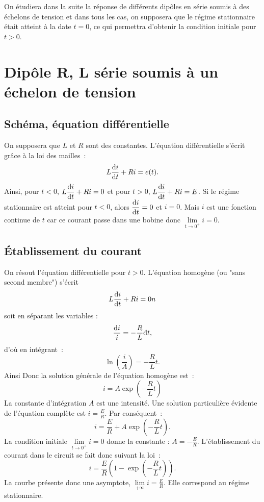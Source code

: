 On étudiera dans la suite la réponse de différents dipôles en série soumis à 
des échelons de tension et dans tous les cas, on supposera que le régime 
stationnaire était atteint à la date \(t = 0\), ce qui permettra d’obtenir la 
condition initiale pour \(t > 0\).
\section{Dipôle R, L série soumis à un échelon de tension}%
\subsection{Schéma, équation différentielle}%
On supposera que \(L\) et \(R\) sont des constantes. L’équation différentielle 
s’écrit grâce à la loi des mailles~:
\begin{equation}%
  L\derived{i}{t}+Ri=e(t).
\end{equation}%
Ainsi, pour \(t < 0\), \(L\dfrac{\mathrm{d} i}{\mathrm{d} t}+Ri=0\) et pour \(t > 0\), 
\(L\dfrac{\mathrm{d} i}{\mathrm{d} t}+Ri=E\).  Si le régime stationnaire est atteint pour \(t < 
0\), alors \(\dfrac{\mathrm{d} i}{\mathrm{d} t}=0\) et \(i = 0\). Mais \(i\) est une fonction 
continue de \(t\) car ce courant passe dans une bobine donc \(\lim\limits_{t 
\to 0^+} i = 0\).
\subsection{Établissement du courant}%
On résout l'équation différentielle pour \(t > 0\). L'équation homogène (ou 
"sans second membre") s'écrit
\begin{equation}%
  L\derived{i}{t}+Ri = 0n
\end{equation}%
soit en séparant les variables :
\begin{equation}%
  \dfrac{\D i}{i} = -\frac{R}{L} \D t,
\end{equation}%
d'où en intégrant~:
\begin{equation}%
  \ln\left(\frac{i}{A}\right) = -\frac{R}{L} t.
\end{equation}%
Ainsi Donc la solution générale de l'équation homogène est~:
\begin{equation}%
  i = A \exp\left(-\frac{R}{L} t\right)
\end{equation}%
La constante d'intégration \(A\) est une intensité. Une solution particulière 
évidente de l'équation complète est \(i = \frac{E}{R}\). Par conséquent~:
\begin{equation}%
  i = \frac{E}{R} + A \exp\left(-\frac{R}{L} t\right).
\end{equation}%
La condition initiale \(\lim\limits_{t \to 0^+} i = 0\) donne la constante : 
\(A = -\frac{E}{R}\). L'établissement du courant dans le circuit se fait donc 
suivant la loi~:
\begin{equation}%
  i = \frac{E}{R} \left(1 - \exp\left(-\frac{R}{L} t\right)\right).
\end{equation}%
La courbe présente donc une asymptote, \(\lim\limits_{+\infty} i = 
\frac{E}{R}\). Elle correspond au régime stationnaire.
